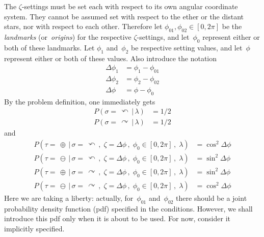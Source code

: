 \documentclass[9pt,technote]{IEEEtran}
\begin{document}
The $\zeta$-settings must be set each with respect to its own angular
coordinate system. They cannot be assumed set with respect to the
ether or the distant stars, nor with respect to each other. Therefore
let $\phi_{01},\phi_{02}\in[0,2\pi]$ be the {\em{landmarks}}
(or~{\em{origins}}) for the respective $\zeta$-settings, and
let~$\phi_0$ represent either or both of these landmarks. Let $\phi_1$
and~$\phi_2$ be respective setting values, and let~$\phi$ represent
either or both of these values. Also introduce the notation
\begin{align}
  \Delta\phi_1&=\phi_1-\phi_{01} \\
  \Delta\phi_2&=\phi_2-\phi_{02} \\
  \Delta\phi&=\phi-\phi_{0}
\end{align}
By the problem definition, one immediately gets
\begin{align}
  P(\sigma=\,\curvearrowleft \,|\, \lambda) &= 1\!/2 \\
  P(\sigma=\,\curvearrowright \,|\, \lambda) &= 1\!/2
\end{align}
and
\begin{align}
  P(\tau=\,\oplus \,|\, \sigma=\,\curvearrowleft\,,\; \zeta=\Delta\phi\,,\; \phi_0\in[0,2\pi]\,,\; \lambda) &= \cos^2 \Delta\phi \\
  P(\tau=\,\ominus \,|\, \sigma=\,\curvearrowleft\,,\; \zeta=\Delta\phi\,,\; \phi_0\in[0,2\pi]\,,\; \lambda) &= \sin^2 \Delta\phi \\
  P(\tau=\,\oplus \,|\, \sigma=\,\curvearrowright\,,\; \zeta=\Delta\phi\,,\; \phi_0\in[0,2\pi]\,,\; \lambda) &= \sin^2 \Delta\phi \\
  P(\tau=\,\ominus \,|\, \sigma=\,\curvearrowright\,,\; \zeta=\Delta\phi\,,\; \phi_0\in[0,2\pi]\,,\; \lambda) &= \cos^2 \Delta\phi
\end{align}
Here we are taking a liberty: actually, for~$\phi_{01}$
and~$\phi_{02}$ there should be a joint probability density function
(pdf) specified in the conditions. However, we shall introduce this
pdf only when it is about to be used. For now, consider it implicitly
specified.
\end{document}
